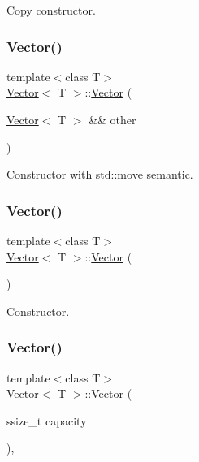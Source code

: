 Copy constructor. \mbox{\label{classVector_a2694f1fd3e904f3d7b9d387cafa1dafe}} 
\subsubsection{\texorpdfstring{Vector()}{Vector()}\hspace{0.1cm}{\footnotesize\ttfamily [5/10]}}
{\footnotesize\ttfamily template$<$class T$>$ \\
\hyperlink{classVector}{Vector}$<$ T $>$\+::\hyperlink{classVector}{Vector} (\begin{DoxyParamCaption}\item[{\hyperlink{classVector}{Vector}$<$ T $>$ \&\&}]{other }\end{DoxyParamCaption})\hspace{0.3cm}{\ttfamily [inline]}}

Constructor with std\+::move semantic. \mbox{\label{classVector_a39d6069675db4ecfc1ab81d440da759a}} 
\subsubsection{\texorpdfstring{Vector()}{Vector()}\hspace{0.1cm}{\footnotesize\ttfamily [6/10]}}
{\footnotesize\ttfamily template$<$class T$>$ \\
\hyperlink{classVector}{Vector}$<$ T $>$\+::\hyperlink{classVector}{Vector} (\begin{DoxyParamCaption}{ }\end{DoxyParamCaption})\hspace{0.3cm}{\ttfamily [inline]}}

Constructor. \mbox{\label{classVector_a2967c34f4076209cb0663428ffd7c54d}} 
\subsubsection{\texorpdfstring{Vector()}{Vector()}\hspace{0.1cm}{\footnotesize\ttfamily [7/10]}}
{\footnotesize\ttfamily template$<$class T$>$ \\
\hyperlink{classVector}{Vector}$<$ T $>$\+::\hyperlink{classVector}{Vector} (\begin{DoxyParamCaption}\item[{ssize\+\_\+t}]{capacity }\end{DoxyParamCaption})\hspace{0.3cm}{\ttfamily [inline]}, {\ttfamily [explicit]}}

